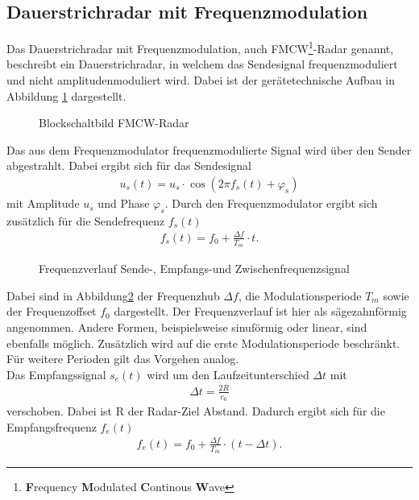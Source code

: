 \subsection{Dauerstrichradar mit Frequenzmodulation}
Das Dauerstrichradar mit Frequenzmodulation, auch FMCW\footnote{\textbf{F}requency \textbf{M}odulated \textbf{C}ontinous \textbf{W}ave}-Radar genannt, beschreibt ein Dauerstrichradar, in welchem das Sendesignal frequenzmoduliert und nicht amplitudenmoduliert wird. Dabei ist der gerätetechnische Aufbau in Abbildung \ref{fig:FMCWRadar} dargestellt. 
\begin{figure}[tbp]
  \centering
  
  \caption{Blockschaltbild FMCW-Radar}
  \label{fig:FMCWRadar}
\end{figure}
Das aus dem Frequenzmodulator frequenzmodulierte Signal wird über den Sender abgestrahlt. Dabei ergibt sich für das Sendesignal
\begin{align}
u_{s}(t) = u_{s} \cdot \cos\left( 2\pi f_{s}(t) + \varphi_{s} \right) 
\end{align}     
mit Amplitude $u_{s}$ und Phase $\varphi_{s}$. Durch den Frequenzmodulator ergibt sich zusätzlich für die Sendefrequenz $f_{s}(t)$
\begin{align}
f_{s}(t) = f_{0} + \frac{\Delta f}{T_{m}}\cdot t.
\end{align}
\begin{figure}[tbp]
  \centering
  
  \caption{Frequenzverlauf Sende-,  Empfangs-und Zwischenfrequenzsignal\cite[S.6]{Huegler}\cite[S.78]{HuderRadar}}
  \label{fig:FMCW_Frequenz}
\end{figure}
Dabei sind in Abbildung\ref{fig:FMCW_Frequenz} der Frequenzhub $\Delta f$, die Modulationsperiode $T_{m}$ sowie der Frequenzoffset $f_{0}$ dargestellt. Der Frequenzverlauf ist hier als sägezahnförmig angenommen. Andere Formen, beispielsweise sinuförmig oder linear, sind ebenfalls möglich. Zusätzlich wird auf die erste Modulationsperiode beschränkt. Für weitere Perioden gilt das Vorgehen analog.\\
Das Empfangssignal $s_{e}(t)$ wird um den Laufzeitunterschied $\Delta t$ mit
\begin{align}
\Delta t = \frac{2R}{c_{0}}
\end{align}
verschoben. Dabei ist R der Radar-Ziel Abstand. Dadurch ergibt sich für die Empfangsfrequenz $f_{e}(t)$ 
\begin{align}
f_{e}(t) = f_{0} + \frac{\Delta f}{T_{m}}\cdot \left( t-\Delta t \right).
\end{align}
